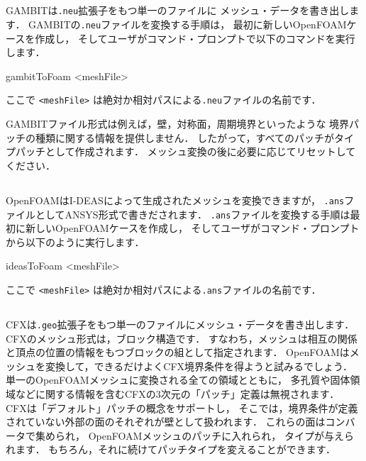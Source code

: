 \subsection{}
\label{ssec:5.5.3}
GAMBITは\texttt{.neu}拡張子をもつ単一のファイルに
メッシュ・データを書き出します．
GAMBITの\texttt{.neu}ファイルを変換する手順は，
最初に新しいOpenFOAMケースを作成し，
そしてユーザがコマンド・プロンプトで以下のコマンドを実行します．
\begin{OFverbatim}[terminal]
gambitToFoam <meshFile>
\end{OFverbatim}
ここで \texttt{<meshFile>} は絶対か相対パスによる\texttt{.neu}ファイルの名前です．

GAMBITファイル形式は例えば，壁，対称面，周期境界といったような
境界パッチの種類に関する情報を提供しません．
したがって，すべてのパッチがタイプパッチとして作成されます．
メッシュ変換の後に必要に応じてリセットしてください．


\subsection{}
\label{ssec:5.5.4}
OpenFOAMはI-DEASによって生成されたメッシュを変換できますが，
\texttt{.ans}ファイルとしてANSYS形式で書きだされます．
\texttt{.ans}ファイルを変換する手順は最初に新しいOpenFOAMケースを作成し，
そしてユーザがコマンド・プロンプトから以下のように実行します．
\begin{OFverbatim}[terminal]
ideasToFoam <meshFile>
\end{OFverbatim}
ここで \texttt{<meshFile>} は絶対か相対パスによる\texttt{.ans}ファイルの名前です．


\subsection{}
\label{ssec:5.5.5}
CFXは\texttt{.geo}拡張子をもつ単一のファイルにメッシュ・データを書き出します．
CFXのメッシュ形式は，ブロック構造です．
すなわち，メッシュは相互の関係と頂点の位置の情報をもつブロックの組として指定されます．
OpenFOAMはメッシュを変換して，できるだけよくCFX境界条件を得ようと試みるでしょう．
単一のOpenFOAMメッシュに変換される全ての領域とともに，
多孔質や固体領域などに関する情報を含むCFXの3次元の「パッチ」定義は無視されます．
CFXは「デフォルト」パッチの概念をサポートし，
そこでは，境界条件が定義されていない外部の面のそれぞれが壁として扱われます．
これらの面はコンバータで集められ，
OpenFOAMメッシュのパッチに入れられ，
タイプが与えられます．
もちろん，それに続けてパッチタイプを変えることができます．

